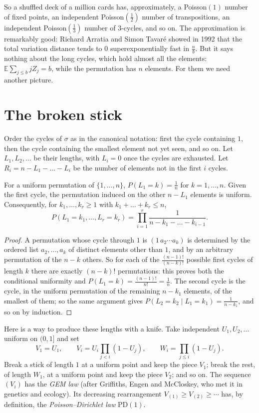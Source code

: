 So a shuffled deck of a million cards has, approximately, a Poisson$(1)$ number of fixed points, an independent Poisson$(\frac12)$ number of transpositions, an independent Poisson$(\frac13)$ number of $3$-cycles, and so on. The approximation is remarkably good: Richard Arratia and Simon Tavar\'e
showed in 1992 that the total variation distance tends to $0$ superexponentially fast in $\frac nb$. But it says nothing about the long cycles, which hold almost all the elements: $\mathbb E\sum_{j\le b}jZ_j=b$, while the
permutation has $n$ elements. For them we need another picture.

\section{The broken stick}

Order the cycles of $\sigma$ as in the canonical notation: first the cycle containing $1$, then the cycle containing the smallest element not yet seen, and so on. Let $L_1,L_2,\dots$ be their lengths, with $L_i=0$ once the cycles are exhausted. Let $R_i=n-L_1-\dots-L_i$ be the number of
elements not in the first $i$ cycles.

\begin{proposition}\label{prop:firstcycle}
For a uniform permutation of $\{1,\dots,n\}$, $P(L_1=k)=\frac1n$ for $k=1,\dots,n$. Given the first cycle, the permutation induced on the other $n-L_1$ elements is uniform. Consequently, for $k_1,\dots,k_r\ge1$ with $k_1+\dots+k_r\le n$,
\[
P(L_1=k_1,\dots,L_r=k_r)=\prod_{i=1}^r\frac1{n-k_1-\dots-k_{i-1}}.
\]
\end{proposition}
\begin{proof}
A permutation whose cycle through $1$ is $(1\,a_2\cdots a_k)$ is determined by the ordered list $a_2,\dots,a_k$ of distinct elements other than $1$, and by an arbitrary permutation of the $n-k$ others. So for each of the $\frac{(n-1)!}{(n-k)!}$ possible first cycles of length
$k$ there are exactly $(n-k)!$ permutations: this proves both the conditional uniformity and $P(L_1=k)=\frac{(n-1)!}{n!}=\frac1n$. The second cycle is the cycle, in the uniform permutation of the remaining $n-k_1$ elements, of the smallest of them; so the same argument gives
$P(L_2=k_2\mid L_1=k_1)=\frac1{n-k_1}$, and so on by induction.
\end{proof}

Here is a way to produce these lengths with a knife. Take independent $U_1,U_2,\dots$ uniform on $(0,1]$ and set
\[
V_1=U_1,\qquad V_i=U_i\prod_{j<i}(1-U_j),\qquad W_i=\prod_{j\le i}(1-U_j).
\]
Break a stick of length $1$ at a uniform point and keep the piece $V_1$; break the rest, of length $W_1$, at a uniform point and keep the piece $V_2$; and so on. The sequence $(V_i)$ has the \emph{GEM law} (after Griffiths, Engen and McCloskey, who met it in genetics and ecology). Its
decreasing rearrangement $V_{(1)}\ge V_{(2)}\ge\cdots$ has, by definition, the \emph{Poisson--Dirichlet law} $\mathrm{PD}(1)$.

